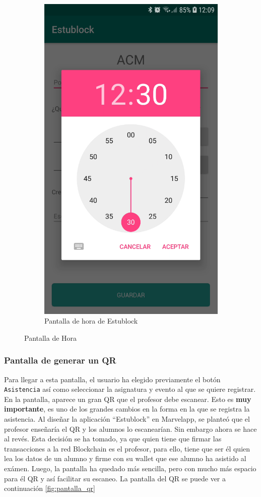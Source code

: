 \begin{figure}[hbt]
\begin{subfigure}[b]{0.4\linewidth}
        \includegraphics[width=0.7\linewidth]{figs/Desarrollo/Interfaz/estublock_crear_evento_hora}
        \caption[Estublock Hora]{Pantalla de hora de Estublock}
	\end{subfigure} 
	\caption[Pantalla de Hora]{Pantalla de Hora}
	\label{fig:pantalla_hora}
\end{figure}

\subsubsection{Pantalla de generar un QR}

Para llegar a esta pantalla, el usuario ha elegido previamente el botón \verb|Asistencia| así como seleccionar la asignatura y evento al que se quiere registrar. En la pantalla, aparece un gran QR que el profesor debe escanear. Esto es \textbf{muy importante}, es uno de los grandes cambios en la forma en la que se registra la asistencia. Al diseñar la aplicación ``Estublock'' en Marvelapp, se planteó que el profesor enseñaría el QR y los alumnos lo escanearían. Sin embargo ahora se hace al revés. Esta decisión se ha tomado, ya que quien tiene que firmar las transacciones a la red Blockchain es el profesor, para ello, tiene que ser él quien lea los datos de un alumno y firme con su wallet que ese alumno ha asistido al exámen. Luego, la pantalla ha quedado más sencilla, pero con mucho más espacio para él QR y así facilitar su escaneo. La pantalla del QR se puede ver a continuación \ref{fig:pantalla_qr}

